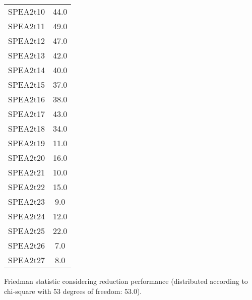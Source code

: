 \documentclass{article}
\begin{document}
\begin{table}[!htp]
\begin{tabular}{c|c}
SPEA2t10&44.0\\
SPEA2t11&49.0\\
SPEA2t12&47.0\\
SPEA2t13&42.0\\
SPEA2t14&40.0\\
SPEA2t15&37.0\\
SPEA2t16&38.0\\
SPEA2t17&43.0\\
SPEA2t18&34.0\\
SPEA2t19&11.0\\
SPEA2t20&16.0\\
SPEA2t21&10.0\\
SPEA2t22&15.0\\
SPEA2t23&9.0\\
SPEA2t24&12.0\\
SPEA2t25&22.0\\
SPEA2t26&7.0\\
SPEA2t27&8.0\\
\end{tabular}
\end{table}


Friedman statistic considering reduction performance (distributed according to chi-square with 53 degrees of freedom: 53.0).
\end{document}
